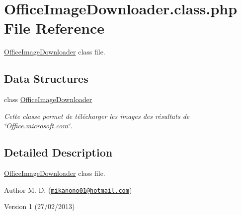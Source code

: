 \hypertarget{_office_image_downloader_8class_8php}{\section{Office\-Image\-Downloader.\-class.\-php File Reference}
\label{_office_image_downloader_8class_8php}
}


\hyperlink{class_office_image_downloader}{Office\-Image\-Downloader} class file.  


\subsection*{Data Structures}
\begin{DoxyCompactItemize}
\item 
class \hyperlink{class_office_image_downloader}{Office\-Image\-Downloader}
\begin{DoxyCompactList}\small\item\em Cette classe permet de télécharger les images des résultats de \char`\"{}\-Office.\-microsoft.\-com\char`\"{}. \end{DoxyCompactList}\end{DoxyCompactItemize}


\subsection{Detailed Description}
\hyperlink{class_office_image_downloader}{Office\-Image\-Downloader} class file. \begin{DoxyAuthor}{Author}
M. D. (\href{mailto:mikanono01@hotmail.com}{\tt mikanono01@hotmail.\-com}) 
\end{DoxyAuthor}
\begin{DoxyVersion}{Version}
1 (27/02/2013) 
\end{DoxyVersion}
